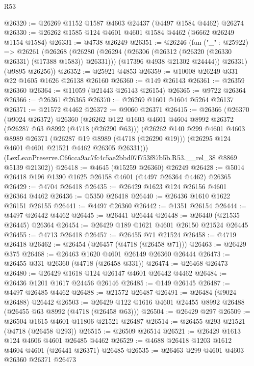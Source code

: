 \begin{lexlean}{R53}
\begin{coremodule}
@26320 := @26269 @1152 @1587 @4603 @24437 (@4497 @1584 @4462) @26274
@26330 := @26262 @1585 @124 @4601 @4601 @1584 @4462 (@6662 @26249 @1154 @1584)
@26331 := @4738 @26249
@26351 := @26246
    (fun ("_" : @25922) =>
    @26261
      (@26268
        (@26280
          (@26294 (@26306 (@26312 (@26320 (@26330 @26331) (@17388 @1583)) @26331)))
          (@17396 @4938 @21302 @24444))
        @26331)
      (@9895 @26256))
@26352 := @25921 @4853
@26359 := @10008 @26249 @331 @22 @1605 @1626 @26138 @26160
@26360 := @149 @26143
@26361 := @26359 @26360
@26364 := @11059 (@21443 @26143 @26154)
@26365 := @9722 @26364
@26366 := @26361 @26365
@26370 := @26269 @1601 @1604 @5264 @26137
@26371 := @21572 @4462
@26372 := @9060 @26371
@26415 := @26366
    (@26370
      (@9024 @26372)
      @26360
      (@26262
        @122
        @1603
        @4601
        @4604
        @8992
        @26372
        (@26287 @63 @8992 (@4718 (@26290 @63)))
        (@26262
          @140
          @299
          @4601
          @4603
          @8989
          @26371
          (@26287 @19 @8989 (@4718 (@26290 @19)))
          (@26295 @124 @4601 @4601 @21521 @4462 @26305 @26331)))
      (LexLeanPreserve.C66cca9ac7fc4c5ae2bbd07f753f87b5b.R53.__rel_38 @8869 @5139 @21302))
@26418 := @4645 (@15259 @26360) @26249
@26428 := @5014 @26418 @196 @1390 @1625 @26158 @4601 (@4497 @26364 @4462) @26365
@26429 := @4704 @26418
@26435 := @26429 @1623 @124 @26156 @4601 @26364 @4462
@26436 := @5350 @26418
@26440 := @26436 @1610 @1622 @26151 @26155
@26441 := @4497 @26360
@26442 := @1351 @26154
@26444 := @4497 @26442 @4462
@26445 := @26441 @26444
@26448 := @26440 (@21535 @26445) @26364
@26454 := @26429 @189 @1621 @4601 @26150 @21524 @26445
@26455 := @4713 @26418
@26457 := @26455 @71 @21524
@26458 := @4719 @26418
@26462 := @26454 (@26457 (@4718 (@26458 @71)))
@26463 := @26429 @375
@26468 := @26463 @1620 @4601 @26149 @26360 @26444
@26473 := @26455 @331 @26360 (@4718 (@26458 @331))
@26474 := @26468 @26473
@26480 := @26429 @1618 @124 @26147 @4601 @26442 @4462
@26484 := @26436 @1201 @1617 @24456 @26146
@26485 := @149 @26145
@26487 := @4497 @26485 @4462
@26488 := @21572 @26487
@26491 := @26484 (@9024 @26488) @26442
@26503 := @26429 @122 @1616 @4601 @24455 @8992 @26488 (@26455 @63 @8992 (@4718 (@26458 @63)))
@26504 := @26429 @297
@26509 := @26504 @1615 @4601 @11806 @21521 @26487
@26514 := @26455 @293 @21521 (@4718 (@26458 @293))
@26515 := @26509 @26514
@26521 := @26429 @1613 @124 @4606 @4601 @26485 @4462
@26529 := @4688 @26418 @1203 @1612 @4604 @4601 (@26441 @26371) @26485
@26535 := @26463 @299 @4601 @4603 @26360 @26371 @26473

\end{coremodule}
\end{lexlean}
